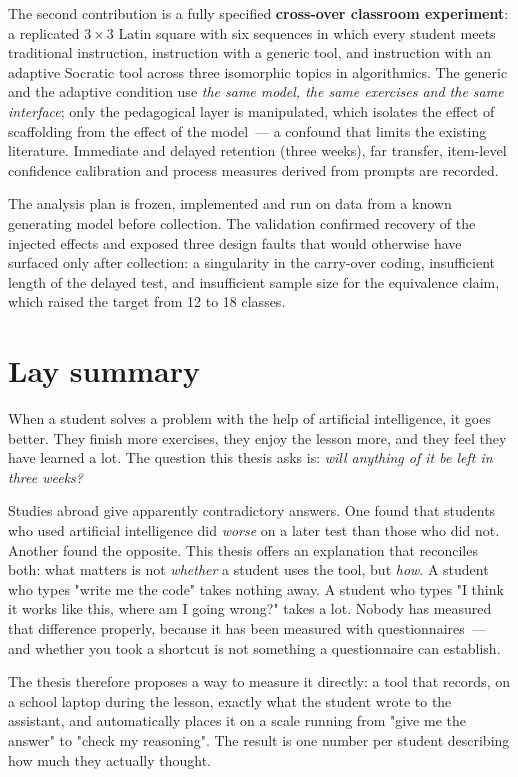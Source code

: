 The second contribution is a fully specified \textbf{cross-over classroom experiment}: a replicated $3\times3$ Latin square with six sequences in which every student meets traditional instruction, instruction with a generic tool, and instruction with an adaptive Socratic tool across three isomorphic topics in algorithmics. The generic and the adaptive condition use \emph{the same model, the same exercises and the same interface}; only the pedagogical layer is manipulated, which isolates the effect of scaffolding from the effect of the model~--- a confound that limits the existing literature. Immediate and delayed retention (three weeks), far transfer, item-level confidence calibration and process measures derived from prompts are recorded.

The analysis plan is frozen, implemented and run on data from a known generating model before collection. The validation confirmed recovery of the injected effects and exposed three design faults that would otherwise have surfaced only after collection: a singularity in the carry-over coding, insufficient length of the delayed test, and insufficient sample size for the equivalence claim, which raised the target from 12 to 18 classes.

\section*{Lay summary}

When a student solves a problem with the help of artificial intelligence, it goes better. They finish more exercises, they enjoy the lesson more, and they feel they have learned a lot. The question this thesis asks is: \emph{will anything of it be left in three weeks?}

Studies abroad give apparently contradictory answers. One found that students who used artificial intelligence did \emph{worse} on a later test than those who did not. Another found the opposite. This thesis offers an explanation that reconciles both: what matters is not \emph{whether} a student uses the tool, but \emph{how}. A student who types "write me the code" takes nothing away. A student who types "I think it works like this, where am I going wrong?" takes a lot. Nobody has measured that difference properly, because it has been measured with questionnaires~--- and whether you took a shortcut is not something a questionnaire can establish.

The thesis therefore proposes a way to measure it directly: a tool that records, on a school laptop during the lesson, exactly what the student wrote to the assistant, and automatically places it on a scale running from "give me the answer" to "check my reasoning". The result is one number per student describing how much they actually thought.


